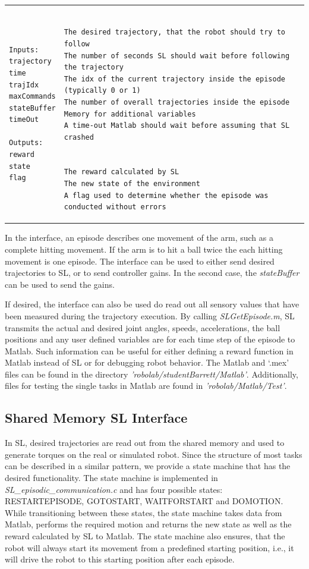\documentclass[11pt, article, colorback]{article}
\begin{document}
\begin{tabular}{ m{3cm} m{7cm}}
\begin{lstlisting}
Inputs:
trajectory 
time
trajIdx
maxCommands
stateBuffer
timeOut

Outputs:
reward
state 
flag
\end{lstlisting}	 
&\begin{lstlisting}

The desired trajectory, that the robot should try to follow 
The number of seconds SL should wait before following the trajectory
The idx of the current trajectory inside the episode (typically 0 or 1)
The number of overall trajectories inside the episode
Memory for additional variables
A time-out Matlab should wait before assuming that SL crashed


The reward calculated by SL
The new state of the environment
A flag used to determine whether the episode was conducted without errors
\end{lstlisting}
\end{tabular}

In the interface, an episode describes one movement of the arm, such as a complete hitting movement. If the arm is 
to hit a ball twice the each hitting movement is one episode. The interface can be used to either send desired trajectories 
to SL, or to send controller gains. In the second case, the {\em stateBuffer} can be used to send the gains. 

If desired, the interface can also be used do read out all sensory values that have been measured during the trajectory execution. 
By calling {\em SLGetEpisode.m}, SL transmits the actual and desired joint angles, speeds, accelerations, the ball positions and any user defined variables 
are for each time step of the episode to Matlab. Such information can be useful for either 
defining a reward function in Matlab instead of SL or for debugging robot behavior. The Matlab and `.mex' files can be found 
in the directory {\em 'robolab/studentBarrett/Matlab'}. Additionally, files for testing the single tasks in Matlab are found in 
{\em 'robolab/Matlab/Test'}.

\subsection{Shared Memory SL Interface}

In SL, desired trajectories are read out from the shared memory and used to generate torques on the real or simulated robot. 
Since the structure of most tasks can be described in a similar pattern, we provide a state machine that has the desired 
functionality. The state machine is implemented in {\em SL\_episodic\_communication.c} and has four possible states: 
RESTARTEPISODE, GOTOSTART, WAITFORSTART and DOMOTION. While transitioning between these states, the state machine 
takes data from Matlab, performs the required motion and returns the new state as well as the reward calculated by SL to Matlab.
The state machine also ensures, that the robot will always start its movement from a predefined starting position, i.e., it will drive 
the robot to this starting position after each episode. 
\end{document}
